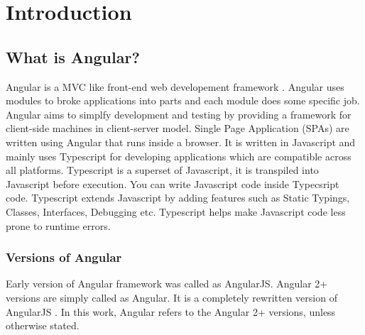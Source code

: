 \chapter{Introduction}
\pagestyle{fancy}
\fancyhead[LO]{\itshape\nouppercase{\rightmark}}




\section{What is Angular?}
\hspace{0.2in}Angular is a MVC like front-end web developement framework \cite{angulario}.  Angular uses modules to broke applications into parts and each module does some specific job. Angular aims to simplfy development and testing by providing a framework for client-side machines in client-server model. Single Page Application (SPAs) are written using Angular that runs inside a browser. It is written in Javascript and mainly uses Typescript for developing applications which are compatible across all platforms. Typescript is a superset of Javascript, it is transpiled into Javascript before execution. You can write Javascript code inside Typecsript code. Typescript extends Javascript by adding features such as Static Typings, Classes, Interfaces, Debugging etc. Typescript helps make Javascript code less prone to runtime errors. 



\subsection{Versions of Angular}
\hspace{0.2in}Early version of Angular framework was called as AngularJS. Angular 2+ versions are simply called as Angular. It is a completely rewritten version of AngularJS \cite{rewritten}. In this work, Angular refers to the Angular 2+ versions, unless otherwise stated. 

